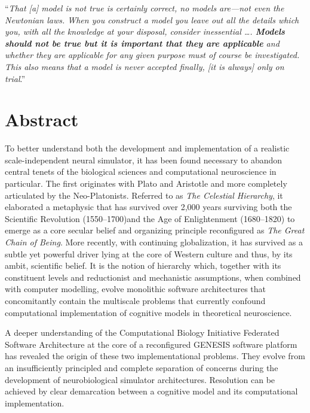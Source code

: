 \documentclass[10pt,letterpaper]{article}
\begin{document}
\vspace*{\baselineskip}
\hspace*{0.025\textwidth}\begin{minipage}{0.8\textwidth}
\noindent ``\small{\textit{That \textnormal{[a]} model is not true is certainly correct, no models are—not even the Newtonian laws. When you construct a model you leave out all the details which you, with all the knowledge at your disposal, consider inessential \ldots. \textbf{Models should not be true but it is important that they are applicable} and whether they are applicable for any given purpose must of course be investigated. This also means that a model is never accepted finally, \textnormal{[it is always]} only on trial}.}''~\cite{rasch80}\\
\end{minipage}

\section*{Abstract}
To better understand both the development and implementation of a realistic scale-independent neural simulator, it has been found necessary to abandon central tenets of the biological sciences and computational neuroscience in particular. The first originates with Plato and Aristotle and more completely articulated by the Neo-Platonists. Referred to as {\it{The Celestial Hierarchy}}, it elaborated a metaphysic that has survived over 2,000 years surviving both the Scientific Revolution (1550--1700)and the Age of Enlightenment (1680--1820) to emerge as a core secular belief and organizing principle reconfigured as {\it{The Great Chain of Being}}. More recently, with continuing globalization, it has survived as a subtle yet powerful driver lying at the core of Western culture and thus, by its ambit, scientific belief. It is the notion of hierarchy which, together with its constituent levels and reductionist and mechanistic assumptions, when combined with computer modelling, evolve monolithic software architectures that concomitantly contain the multiscale problems that currently confound computational implementation of cognitive models in theoretical neuroscience.

A deeper understanding of the Computational Biology Initiative Federated Software Architecture at the core of a reconfigured GENESIS software platform has revealed the origin of these two implementational problems. They evolve from an insufficiently principled and complete separation of concerns during the development of neurobiological simulator architectures. Resolution can be achieved by clear demarcation between a cognitive model and its computational implementation.
\end{document}

